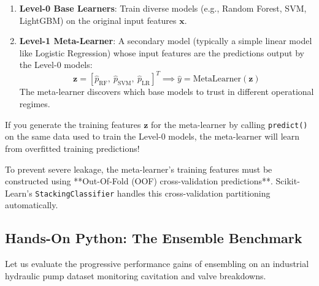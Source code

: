 \begin{enumerate}
    \item \textbf{Level-0 Base Learners}: Train diverse models (e.g., Random Forest, SVM, LightGBM) on the original input features $\mathbf{x}$.
    \item \textbf{Level-1 Meta-Learner}: A secondary model (typically a simple linear model like Logistic Regression) whose input features are the predictions output by the Level-0 models:
    \begin{equation}
    \mathbf{z} = [ \hat{p}_{\text{RF}}, \ \hat{p}_{\text{SVM}}, \ \hat{p}_{\text{LR}} ]^T \implies \hat{y} = \text{MetaLearner}(\mathbf{z})
    \end{equation}
    The meta-learner discovers which base models to trust in different operational regimes.
\end{enumerate}

\begin{warning}
If you generate the training features $\mathbf{z}$ for the meta-learner by calling \texttt{predict()} on the same data used to train the Level-0 models, the meta-learner will learn from overfitted training predictions!

To prevent severe leakage, the meta-learner's training features must be constructed using **Out-Of-Fold (OOF) cross-validation predictions**. Scikit-Learn's \texttt{StackingClassifier} handles this cross-validation partitioning automatically.
\end{warning}

\subsection{Hands-On Python: The Ensemble Benchmark}\label{subsec:ensembles_python}

Let us evaluate the progressive performance gains of ensembling on an industrial hydraulic pump dataset monitoring cavitation and valve breakdowns.

